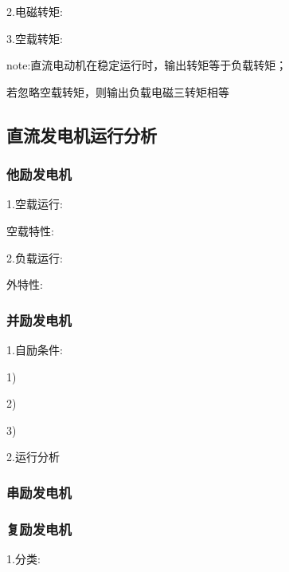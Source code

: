\documentclass[11pt,twoside,a4paper]{ctexart}
\begin{document}
    2.电磁转矩:

    3.空载转矩:

    note:直流电动机在稳定运行时，输出转矩等于负载转矩；

    若忽略空载转矩，则输出负载电磁三转矩相等

    \subsection{直流发电机运行分析}
    \subsubsection{他励发电机}
    1.空载运行:

    空载特性:

    2.负载运行:

    外特性:

    \subsubsection{并励发电机}
    1.自励条件:
    \begin{minipage}[t]{0.9\linewidth}
        1)

        2)

        3)
    \end{minipage}

    2.运行分析

    \subsubsection{串励发电机}

    \subsubsection{复励发电机}


    1.分类:
\end{document}

